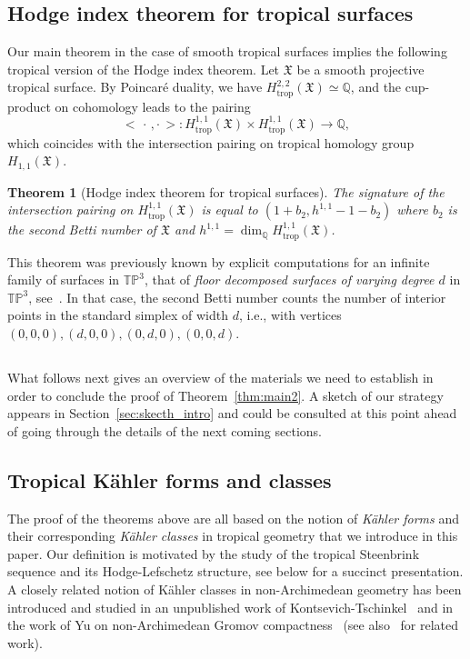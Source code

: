 \documentclass[11pt]{amsart}
\newtheorem{thm}{Theorem}[section]
\theoremstyle{definition}
\numberwithin{equation}{section}
\newcommand{\ie}{i.e.}
\renewcommand{\~}{\widetilde}
\newcommand{\Q}{\mathbb{Q}}
\newcommand{\ccdot}{\,\cdot\,}
\newcommand{\rdot}{\cdot\,}
\newcommand{\trop}{\mathrm{trop}} %
\newcommand{\TP}{\mathbb{TP}} %
\newcommand{\X}{\mathfrak X}
\begin{document}
\subsection{Hodge index theorem for tropical surfaces} Our main theorem in the case of smooth tropical surfaces implies the following tropical version of the Hodge index theorem. Let $\X$ be a smooth projective tropical surface. By Poincar\'e duality, we have $H^{2,2}_\trop(\X) \simeq \Q$, and the cup-product on cohomology leads to the pairing
\[\bigl< \ccdot , \rdot \bigr> \colon H^{1,1}_\trop(\X) \times H^{1,1}_\trop(\X) \to \Q,\]
which coincides with the intersection pairing on tropical homology group $H_{1,1}(\X)$.
\begin{thm}[Hodge index theorem for tropical surfaces]\label{thm:hodgeindex} The signature of the intersection pairing on $H^{1,1}_\trop(\X)$ is equal to $(1+b_2, h^{1,1}- 1- b_2)$ where $b_2$ is the second Betti number of $\X$ and $h^{1,1} =  \dim_\Q H^{1,1}_\trop(\X)$.
\end{thm}
This theorem was previously known  by explicit computations for an infinite family of surfaces in $\TP^3$, that of \emph{floor decomposed surfaces of varying degree $d$} in $\TP^3$, see~\cite{Sha13b}. In that case, the second Betti number counts the number of interior points in the standard simplex of width $d$, \ie, with vertices $(0,0,0), (d,0,0), (0,d,0), (0,0,d)$.

\medskip

\subsection{} What follows next gives an overview of the materials we need to establish in order to  conclude the proof of Theorem~\ref{thm:main2}. A sketch of our strategy appears in Section~\ref{sec:skecth_intro} and could be consulted at this point ahead of going through the details of the next coming sections.

\subsection{Tropical K\"ahler forms and classes} \label{sec:kahler-intro} The proof of the theorems above are all based on the notion of \emph{K\"ahler forms} and their corresponding \emph{K\"ahler classes} in tropical geometry that we introduce in this paper. Our definition is motivated by the study of the tropical Steenbrink sequence and its Hodge-Lefschetz structure, see below for a succinct presentation. A closely related notion of K\"ahler classes in non-Archimedean geometry has been introduced and studied in an unpublished work of Kontsevich-Tschinkel~\cite{KT} and in the work of Yu on non-Archimedean Gromov compactness~\cite{Yu} (see also~\cites{Bou, BFJ15, BGS, CLD, GK17, Zhang} for related work).
\end{document}

